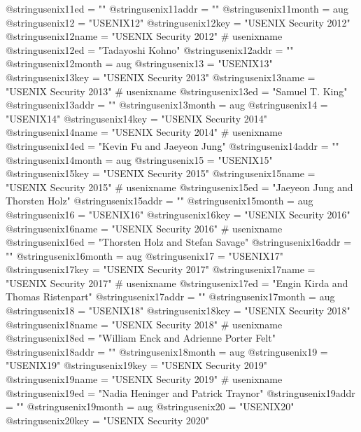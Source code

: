 @string{usenix11ed =            ""}
@string{usenix11addr =          ""}
@string{usenix11month =         aug}
@string{usenix12 =              "USENIX12"}
@string{usenix12key =           "USENIX Security 2012"}
@string{usenix12name =          "USENIX Security 2012" # usenixname}
@string{usenix12ed =            "Tadayoshi Kohno"}
@string{usenix12addr =          ""}
@string{usenix12month =         aug}
@string{usenix13 =              "USENIX13"}
@string{usenix13key =           "USENIX Security 2013"}
@string{usenix13name =          "USENIX Security 2013" # usenixname}
@string{usenix13ed =            "Samuel T. King"}
@string{usenix13addr =          ""}
@string{usenix13month =         aug}
@string{usenix14 =              "USENIX14"}
@string{usenix14key =           "USENIX Security 2014"}
@string{usenix14name =          "USENIX Security 2014" # usenixname}
@string{usenix14ed =            "Kevin Fu and Jaeyeon Jung"}
@string{usenix14addr =          ""}
@string{usenix14month =         aug}
@string{usenix15 =              "USENIX15"}
@string{usenix15key =           "USENIX Security 2015"}
@string{usenix15name =          "USENIX Security 2015" # usenixname}
@string{usenix15ed =            "Jaeyeon Jung and Thorsten Holz"}
@string{usenix15addr =          ""}
@string{usenix15month =         aug}
@string{usenix16 =              "USENIX16"}
@string{usenix16key =           "USENIX Security 2016"}
@string{usenix16name =          "USENIX Security 2016" # usenixname}
@string{usenix16ed =            "Thorsten Holz and Stefan Savage"}
@string{usenix16addr =          ""}
@string{usenix16month =         aug}
@string{usenix17 =              "USENIX17"}
@string{usenix17key =           "USENIX Security 2017"}
@string{usenix17name =          "USENIX Security 2017" # usenixname}
@string{usenix17ed =            "Engin Kirda and Thomas Ristenpart"}
@string{usenix17addr =          ""}
@string{usenix17month =         aug}
@string{usenix18 =              "USENIX18"}
@string{usenix18key =           "USENIX Security 2018"}
@string{usenix18name =          "USENIX Security 2018" # usenixname}
@string{usenix18ed =            "William Enck and Adrienne Porter Felt"}
@string{usenix18addr =          ""}
@string{usenix18month =         aug}
@string{usenix19 =              "USENIX19"}
@string{usenix19key =           "USENIX Security 2019"}
@string{usenix19name =          "USENIX Security 2019" # usenixname}
@string{usenix19ed =            "Nadia Heninger and Patrick Traynor"}
@string{usenix19addr =          ""}
@string{usenix19month =         aug}
@string{usenix20 =              "USENIX20"}
@string{usenix20key =           "USENIX Security 2020"}
